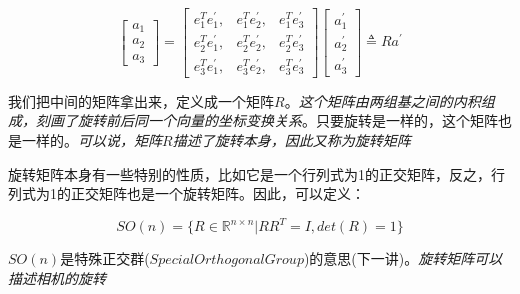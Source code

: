 $$
\begin{bmatrix}
    a_1 \\ a_2 \\ a_3
\end{bmatrix} = 
\begin{bmatrix}
    e_1^Te_1^{'}, & e_1^Te_2^{'}, & e_1^Te_3^{'} \\
    e_2^Te_1^{'}, & e_2^Te_2^{'}, & e_2^Te_3^{'} \\
    e_3^Te_1^{'}, & e_3^Te_2^{'}, & e_3^Te_3^{'} 
\end{bmatrix}
\begin{bmatrix}
    a_1^{'} \\ a_2^{'} \\ a_3^{'}
\end{bmatrix} \triangleq Ra^{'}
$$

    我们把中间的矩阵拿出来，定义成一个矩阵$R$。\emph{这个矩阵由两组基之间的内积组成，刻画了旋转前后同一个向量的坐标变换关系}。只要旋转是一样的，这个矩阵也是一样的。\emph{可以说，矩阵$R$描述了旋转本身，因此又称为旋转矩阵}

    旋转矩阵本身有一些特别的性质，比如它是一个行列式为1的正交矩阵，反之，行列式为1的正交矩阵也是一个旋转矩阵。因此，可以定义：

$$
	SO(n) = \{R \in \mathbb{R}^{n \times n} | RR^T = I, det(R) = 1 \}
$$

    $SO(n)$是特殊正交群($Special Orthogonal Group$)的意思(下一讲)。\emph{旋转矩阵可以描述相机的旋转}

